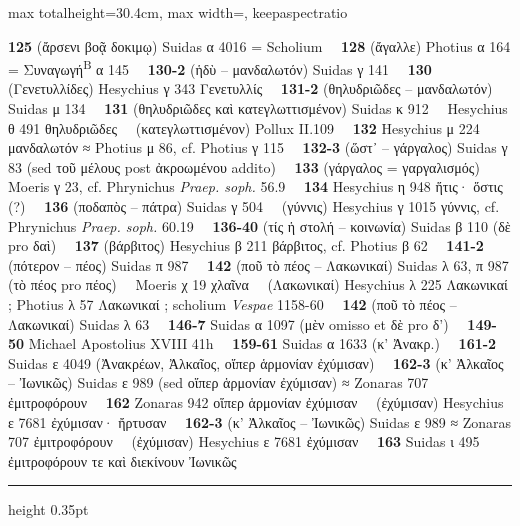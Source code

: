 \documentclass[11pt,twoside]{book}
\newcommand{\italique}[1]{\textit{#1}}
\newcommand{\expo}[1]{\textsuperscript{#1}}
\newcommand{\SynB}{Συναγωγή\expo{B} }
\newcommand{\Apostol}{Michael Apostolius }
\newcommand{\Phryn}{Phrynichus \textit{Praep. soph.} }
\newcommand{\espTest}{\ {\color{ruleGold}{\policeFr ∥}}\ }
\begin{document}
\begin{adjustbox}{max totalheight=30.4cm, max width=\textwidth, keepaspectratio}
\begin{minipage}{\textwidth}
{ \textbf{125} (ἄρσενι βοᾷ δοκιμῳ) Suidas α 4016 = Scholium \espTest \textbf{128} (ἄγαλλε) Photius α 164 = \SynB α 145 \espTest \textbf{130-2} (ἡδὺ -- μανδαλωτόν) Suidas γ 141 \espTest \textbf{130} (Γενετυλλίδες) Hesychius γ 343 Γενετυλλίς \espTest \textbf{131-2} (θηλυδριῶδες -- μανδαλωτόν) Suidas μ 134 \espTest \textbf{131} (θηλυδριῶδες καὶ κατεγλωττισμένον) Suidas κ 912 \espTest Hesychius θ 491 θηλυδριῶδες \espTest (κατεγλωττισμένον) Pollux II.109 \espTest \textbf{132} Hesychius μ 224 μανδαλωτόν {\policeFr ≈} Photius μ 86, cf. Photius γ 115 \espTest \textbf{132-3} (ὥστ᾽ -- γάργαλος) Suidas γ 83 (sed τοῦ μέλους post ἀκροωμένου addito) \espTest \textbf{133} (γάργαλος = γαργαλισμός) Moeris γ 23, cf. \Phryn 56.9 \espTest \textbf{134} Hesychius η 948 ἥτις· ὅστις (?) \espTest \textbf{136} (ποδαπὸς -- πάτρα) Suidas γ 504 \espTest (γύννις) Hesychius γ 1015 γύννις, cf. \Phryn 60.19 \espTest \textbf{136-40} (τίς ἡ στολή -- κοινωνία) Suidas β 110 (δὲ pro δαὶ) \espTest \textbf{137} (βάρβιτος) Hesychius β 211 βάρβιτος, cf. Photius β 62 \espTest \textbf{141-2} (πότερον -- πέος) Suidas π 987 \espTest \textbf{142} (ποῦ τὸ πέος -- Λακωνικαί) Suidas λ 63, π 987 (τὸ πέος pro πέος) \espTest Moeris χ 19 χλαῖνα \espTest (Λακωνικαί) Hesychius λ 225 Λακωνικαί ; Photius λ 57 Λακωνικαί ; scholium \italique{Vespae} 1158-60 \espTest \textbf{142} (ποῦ τὸ πέος -- Λακωνικαί) Suidas λ 63 \espTest \textbf{146-7} Suidas α 1097 (μὲν omisso et δὲ pro δ') \espTest \textbf{149-50} \Apostol XVIII 41h \espTest \textbf{159-61} Suidas α 1633 (κ' Ἀνακρ.) \espTest \textbf{161-2} Suidas ε 4049 (Ἀνακρέων, Ἀλκαῖος, οἵπερ ἁρμονίαν ἐχύμισαν) \espTest \textbf{162-3} (κ' Ἀλκαῖος -- Ἰωνικῶς) Suidas ε 989 (sed οἵπερ ἁρμονίαν ἐχύμισαν) {\policeFr ≈} Zonaras 707 ἐμιτροφόρουν \espTest \textbf{162} Zonaras 942 οἵπερ ἁρμονίαν ἐχύμισαν \espTest (ἐχύμισαν) Hesychius ε 7681 ἐχύμισαν· ἤρτυσαν \espTest \textbf{162-3} (κ' Ἀλκαῖος -- Ἰωνικῶς) Suidas ε 989 {\policeFr ≈} Zonaras 707 ἐμιτροφόρουν \espTest (ἐχύμισαν) Hesychius ε 7681 ἐχύμισαν \espTest \textbf{163} Suidas ι 495 ἐμιτροφόρουν τε καὶ διεκίνουν Ἰωνικῶς\par\vspace{2.5pt}
{\color{ruleGold}\hrule height 0.35pt}\vspace{2.5pt}
}
\end{minipage}
\end{adjustbox}
\end{document}
